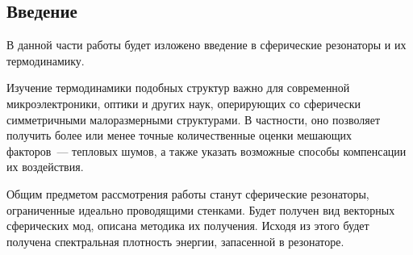 %
%
%
%
%
%

\subsection*{Введение}

    В данной части работы будет изложено введение в сферические резонаторы и их термодинамику.

    Изучение термодинамики подобных структур важно для современной микроэлектроники, оптики и других наук, оперирующих со сферически симметричными малоразмерными структурами. В частности, оно позволяет получить более или менее точные количественные оценки мешающих факторов~--- тепловых шумов, а также указать возможные способы компенсации их воздействия.

    Общим предметом рассмотрения работы станут сферические резонаторы, ограниченные идеально проводящими стенками. Будет получен вид векторных сферических мод, описана методика их получения. Исходя из этого будет получена спектральная плотность энергии, запасенной в резонаторе.
